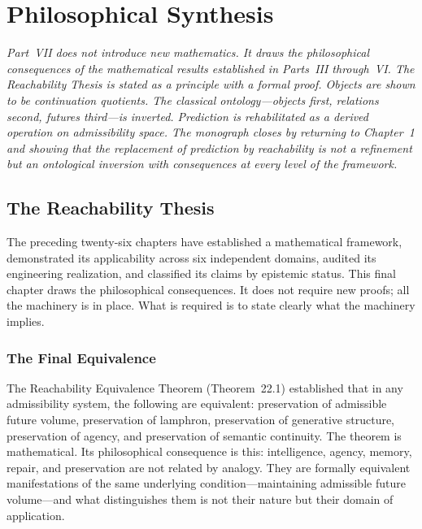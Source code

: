 \documentclass[12pt, oneside]{book}
\theoremstyle{flyxion}
\theoremstyle{definition}
\begin{document}
\part{Philosophical Synthesis}

\noindent\textit{Part~VII does not introduce new
mathematics. It draws the philosophical consequences
of the mathematical results established in Parts~III
through~VI. The Reachability Thesis is stated as a
principle with a formal proof. Objects are shown to
be continuation quotients. The classical
ontology---objects first, relations second, futures
third---is inverted. Prediction is rehabilitated
as a derived operation on admissibility space. The
monograph closes by returning to Chapter~1 and showing
that the replacement of prediction by reachability
is not a refinement but an ontological inversion with
consequences at every level of the framework.}

\bigskip

\chapter{The Reachability Thesis}

The preceding twenty-six chapters have established a
mathematical framework, demonstrated its applicability
across six independent domains, audited its engineering
realization, and classified its claims by epistemic
status. This final chapter draws the philosophical
consequences. It does not require new proofs; all the
machinery is in place. What is required is to state
clearly what the machinery implies.

\section{The Final Equivalence}

The Reachability Equivalence Theorem (Theorem~22.1)
established that in any admissibility system, the
following are equivalent: preservation of admissible
future volume, preservation of lamphron, preservation
of generative structure, preservation of agency,
and preservation of semantic continuity. The theorem
is mathematical. Its philosophical consequence is
this: intelligence, agency, memory, repair, and
preservation are not related by analogy. They are
formally equivalent manifestations of the same
underlying condition---maintaining admissible future
volume---and what distinguishes them is not their
nature but their domain of application.
\end{document}
